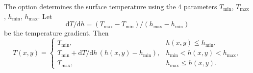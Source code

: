 \begin{itemize}
    The option  determines the surface temperature using the 4 parameters $T_{\mathrm{min}}$, $T_{\mathrm{max}}$, $h_{\mathrm{min}}$, $h_{\mathrm{max}}$. Let
    \begin{equation}
      \mathrm{d}T/\mathrm{d}h = (T_{\text{max}} - T_{\text{min}}) / (h_{\text{max}} - h_{\text{min}})
    \end{equation}
    be the temperature gradient.  Then
    \begin{equation}
      T(x,y) = \begin{cases}
        T_{\text{min}}, & h(x,y) \le h_{\text{min}}, \\
        T_{\text{min}} + \mathrm{d}T/\mathrm{d}h\,(h(x,y) - h_{\text{min}}),
        &  h_{\text{min}} < h(x,y) < h_{\text{max}}, \\
        T_{\text{max}}, & h_{\text{max}} \le h(x,y). \end{cases}
    \end{equation}
    

\end{itemize}
